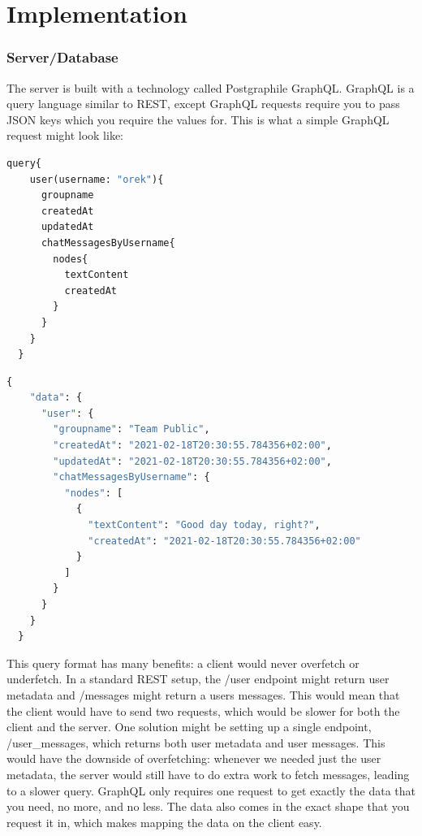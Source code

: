 \documentclass{l4proj}
\begin{document}
\chapter{Implementation}
\subsection{Server/Database}
The server is built with a technology called Postgraphile GraphQL. GraphQL is a query language similar to REST, except GraphQL requests require you to pass JSON keys which you require the values for. This is what a simple GraphQL request might look like: 

\begin{lstlisting}[language=python, caption={An example GraphQL query fetching information about user "orek" and their messages }, label=lst:callahan]
  query{
    user(username: "orek"){
      groupname
      createdAt
      updatedAt
      chatMessagesByUsername{
        nodes{
          textContent
          createdAt
        }
      }
    }
  }
\end{lstlisting}

\begin{lstlisting}[language=python, caption={Server response to the above query}]
  {
    "data": {
      "user": {
        "groupname": "Team Public",
        "createdAt": "2021-02-18T20:30:55.784356+02:00",
        "updatedAt": "2021-02-18T20:30:55.784356+02:00",
        "chatMessagesByUsername": {
          "nodes": [
            {
              "textContent": "Good day today, right?",
              "createdAt": "2021-02-18T20:30:55.784356+02:00"
            }
          ]
        }
      }
    }
  }
\end{lstlisting}
This query format has many benefits: a client would never overfetch or underfetch. In a standard REST setup, the /user endpoint might return user metadata and /messages might return a users messages. This would mean that the client would have to send two requests, which would be slower for both the client and the server. One solution might be setting up a single endpoint, /user\_messages, which returns both user metadata and user messages. This would have the downside of overfetching: whenever we needed just the user metadata, the server would still have to do extra work to fetch messages, leading to a slower query. GraphQL only requires one request to get exactly the data that you need, no more, and no less. The data also comes in the exact shape that you request it in, which makes mapping the data on the client easy. 
\end{document}
